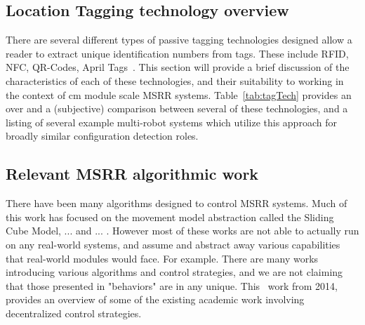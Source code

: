 \subsection{Location Tagging technology overview}
\label{sec:RWtaggingTech}

There are several different types of passive tagging technologies designed allow a reader to extract unique identification numbers from tags. These include RFID, NFC, QR-Codes, April Tags~\cite{wang2016iros}. This section will provide a brief discussion of the characteristics of each of these technologies, and their suitability to working in the context of cm module scale MSRR systems. Table~\ref{tab:tagTech} provides an over and a (subjective) comparison between several of these technologies, and a listing of several example multi-robot systems which utilize this approach for broadly similar configuration detection roles.

\subsection{Relevant MSRR algorithmic work}
\label{sec:RW-Algorithmic}
There have been many algorithms designed to control MSRR systems. Much of this work has focused on the movement model abstraction called the Sliding Cube Model, ... and ... . However most of these works are not able to actually run on any real-world systems, and assume and abstract away various capabilities that real-world modules would face. For example. There are many works introducing various algorithms and control strategies, and we are not claiming that those presented in "behaviors" are in any unique. This~\cite{abukhalil2013survey}  work from 2014, provides an overview of some of the existing academic work involving decentralized control strategies.